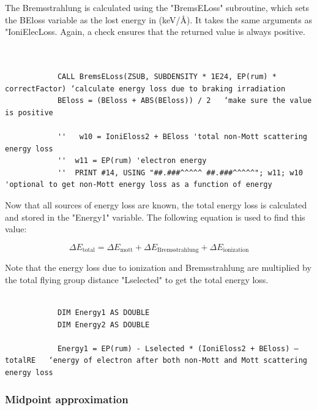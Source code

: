 \documentclass[10pt, reqno]{exam}
\begin{document}
The Bremsstrahlung is calculated using the "BremsELoss" subroutine, which sets the BEloss variable as the lost energy in (\si{keV/\angstrom}). It takes the same arguments as "IoniElecLoss. Again, a check ensures that the returned value is always positive. \par

\begin{verbatim}

    
            CALL BremsELoss(ZSUB, SUBDENSITY * 1E24, EP(rum) * correctFactor) ‘calculate energy loss due to braking irradiation 
            BEloss = (BEloss + ABS(BEloss)) / 2   ‘make sure the value is positive
    
            ''   w10 = IoniEloss2 + BEloss 'total non-Mott scattering energy loss
            ''  w11 = EP(rum) 'electron energy 
            ''  PRINT #14, USING "##.###^^^^^ ##.###^^^^^"; w11; w10 'optional to get non-Mott energy loss as a function of energy
\end{verbatim}

Now that all sources of energy loss are known, the total energy loss is calculated and stored in the "Energy1" variable. The following equation is used to find this value: \par

\begin{equation}
    \Delta E_{\text{total}} = \Delta E_{\text{mott}} + \Delta E_{\text{Bremsstrahlung}} + \Delta E_{\text{ionization}}
\end{equation}

Note that the energy loss due to ionization and Bremsstrahlung are multiplied by the total flying group distance "Lselected" to get the total energy loss. \par

\begin{verbatim}

            DIM Energy1 AS DOUBLE
            DIM Energy2 AS DOUBLE
    
            Energy1 = EP(rum) - Lselected * (IoniEloss2 + BEloss) – totalRE   ‘energy of electron after both non-Mott and Mott scattering energy loss
\end{verbatim}

\subsubsection{Midpoint approximation}
\end{document}
